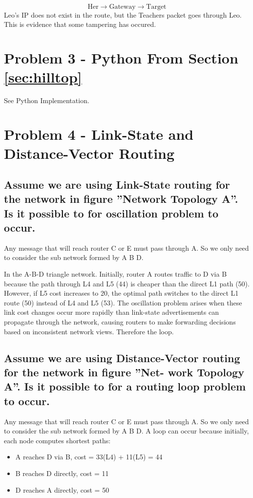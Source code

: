 \documentclass{article}
\begin{document}
	\[
		\text{Her} \xrightarrow{} \text{Gateway} \xrightarrow{} \text{Target}
	\]
	Leo's IP does not exist in the route, but the Teachers packet goes through Leo.
	This is evidence that some tampering has occured.

\section{Problem 3 - Python From Section \ref{sec:hilltop}}

See Python Implementation.

\section{Problem 4 - Link-State and Distance-Vector Routing}

\subsection{Assume we are using Link-State routing for the network in figure  ”Network
Topology A”. Is it possible to for oscillation problem to occur.}

Any message that will reach router C or E must pass through A. So we only need to consider the sub network formed by A B D.

In the A-B-D triangle network. 
Initially, router A routes traffic to D via B because the path through L4 and L5 (44) is cheaper than the direct L1 path (50).
However, if L5 cost increases to 20, the optimal path switches to the direct L1 route (50) instead of L4 and L5 (53).
The oscillation problem arises when these link cost changes occur more rapidly than link-state advertisements can propagate through the network, 
causing routers to make forwarding decisions based on inconsistent network views. Therefore the loop.

\subsection{Assume we are using Distance-Vector routing for the network in figure ”Net-
work Topology A”. Is it possible to for a routing loop problem to occur.}

Any message that will reach router C or E must pass through A. So we only need to consider the sub network formed by A B D. A loop can occur because initially, each node computes shortest paths:

\begin{itemize}
	\item A reaches D via B, cost = 33(L4) + 11(L5) = 44
	\item B reaches D directly, cost = 11
	\item D reaches A directly, cost = 50
\end{itemize}
\end{document}
